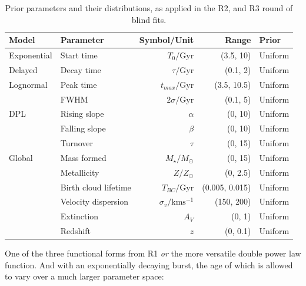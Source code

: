 \documentclass[a4paper,11pt]{article}
\begin{document}
\begin{table}
  \centering
  \begin{tabular}{l l r r l}
    Model       & Parameter            & Symbol/Unit                  & Range          & Prior   \\
    \hline \hline
    Exponential & Start time           & $T_0/\mathrm{Gyr}$           & (3.5, 10)      & Uniform \\
    Delayed     & Decay time           & $\tau/\mathrm{Gyr}$          & (0.1, 2)       & Uniform \\
    \hline
    Lognormal   & Peak time            & $t_{max}/\mathrm{Gyr}$       & (3.5, 10.5)    & Uniform \\
                & FWHM                 & $2\sigma/\mathrm{Gyr}$       & (0.1, 5)       & Uniform \\
    \hline
    DPL         & Rising slope         & $\alpha$                     & (0, 10)        & Uniform \\
                & Falling slope        & $\beta$                      & (0, 10)        & Uniform \\
                & Turnover             & $\tau$                       & (0, 15)        & Uniform \\
    \hline
    Global      & Mass formed          & $M_\star/M_\odot$            & (0, 15)        & Uniform \\
                & Metallicity          & $Z/Z_\odot$                  & (0, 2.5)       & Uniform \\
                & Birth cloud lifetime & $T_{BC}/\mathrm{Gyr}$        & (0.005, 0.015) & Uniform \\
                & Velocity dispersion  & $\sigma_v/\mathrm{kms^{-1}}$ & (150, 200)     & Uniform \\
                & Extinction           & $A_V$                        & (0, 1)         & Uniform \\
                & Redshift             & $z$                          & (0, 0.1)       & Uniform \\
    \hline
  \end{tabular}
  \caption{Prior parameters and their distributions, as applied in the R2, and R3 round of blind fits.}
  \label{tab:r2_r3_priors}
\end{table}

One of the three functional forms from R1 \textit{or} the more versatile double power law function.
And with an exponentially decaying burst, the age of which is allowed to vary over a much larger parameter space:
\end{document}
